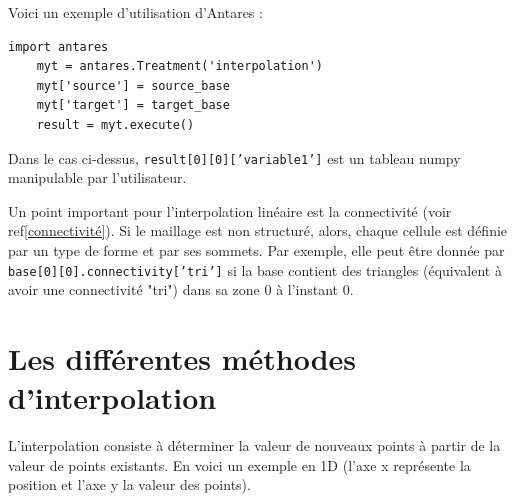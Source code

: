 Voici un exemple d'utilisation d'Antares :

\begin{lstlisting}[caption=Exemple simple d'utilisation d'Antares pour interpoler, label={lst:antares_2}]
    import antares
    myt = antares.Treatment('interpolation')
    myt['source'] = source_base
    myt['target'] = target_base
    result = myt.execute()
\end{lstlisting}

Dans le cas ci-dessus, \texttt{result[0][0]['variable1']} est un tableau numpy manipulable par l'utilisateur.

Un point important pour l'interpolation linéaire est la connectivité (voir ref\ref{connectivité}). Si le maillage est non structuré, alors, chaque cellule est définie par un type de forme et par ses sommets. Par exemple, elle peut être donnée par \texttt{base[0][0].connectivity['tri']} si la base contient des triangles (équivalent à avoir une connectivité "tri") dans sa zone 0 à l'instant 0.


\section{Les différentes méthodes d'interpolation}

L'interpolation consiste à déterminer la valeur de nouveaux points à partir de la valeur de points existants. En voici un exemple en \ac{1D} (l'axe x représente la position et l'axe y la valeur des points).

\vspace{0,5cm}


